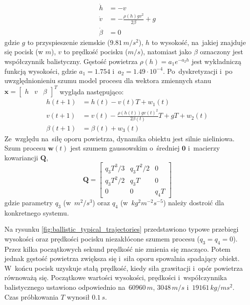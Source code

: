 \begin{align}\label{eq:missile_tracking_model}
\dot{h} &= -v \nonumber \\
\dot{v} &= - \frac{\rho(h)gv^2}{2\beta} + g \nonumber \\
\dot{\beta} &= 0
\end{align}
gdzie $g$ to przyspieszenie ziemskie ($9.81\,m/s^2$), $h$ to wysokość, na~jakiej znajduje się pocisk (w $m$), $v$ to prędkość pocisku ($m/s$), natomiast jako $\beta$ oznaczony jest współczynnik balistyczny. Gęstość powietrza $\rho(h)=a_1e^{-a_2h}$ jest wykładniczą funkcją wysokości, gdzie $a_1=1.754$ i~$a_2=1.49\cdot10^{-4}$.
Po~dyskretyzacji i~po uwzględnionieniu szumu model procesu dla wektora zmiennych stanu $\boldsymbol{x}=\begin{bmatrix}
h & v & \beta
\end{bmatrix}^T$ wygląda następująco:
\begin{align}\label{eq:missile_tracking_discretized_model}
	h(t+1) &= h(t) - v(t)T + w_1(t) \nonumber \\
	v(t+1) &= v(t)-\frac{\rho(h(t))gv(t)^2}{2\beta(t)}T + gT + w_2(t) \nonumber \\
	\beta(t+1) &= \beta(t) + w_3(t)
\end{align}
Ze~względu na~siłę oporu powietrza, dynamika obiektu jest silnie nieliniowa. Szum procesu $\boldsymbol{w}(t)$ jest szumem gaussowskim o~średniej $\boldsymbol{0}$ i~macierzy kowariancji $\boldsymbol{Q}$,
\begin{equation}
\boldsymbol{Q} = 
	\begin{bmatrix}
	q_3T^3/3 & q_3T^2/2 & 0 \\
	q_3T^2/2 & q_3T & 0 \\
	0 & 0 & q_4T
	\end{bmatrix}
\end{equation}
gdzie parametry $q_3$ (w~$m^2/s^3$) oraz $q_4$ (w~$kg^2m^{-2}s^{-5}$) należy dostroić dla konkretnego systemu. \par
Na rysunku \ref{fig:ballistic_typical_trajectories} przedstawiono typowe przebiegi wysokości oraz prędkości pocisku niezakłócone szumem procesu ($q_3=q_4=0$). Przez kilka początkowych sekund prędkość nie zmienia się znacząco. Potem jednak gęstość powietrza zwiększa się i~siła oporu spowalnia spadający obiekt. W~końcu pocisk uzyskuje stałą prędkość, kiedy siła grawitacji i~opór powietrza równoważą się. Początkowe wartości wysokości, prędkości i~współczynnika balistycznego ustawiono odpowiednio na~$60960\,m$, $3048\,m/s$ i~$19161\,kg/ms^2$. Czas próbkowania $T$ wynosił $0.1\,s$.\par
